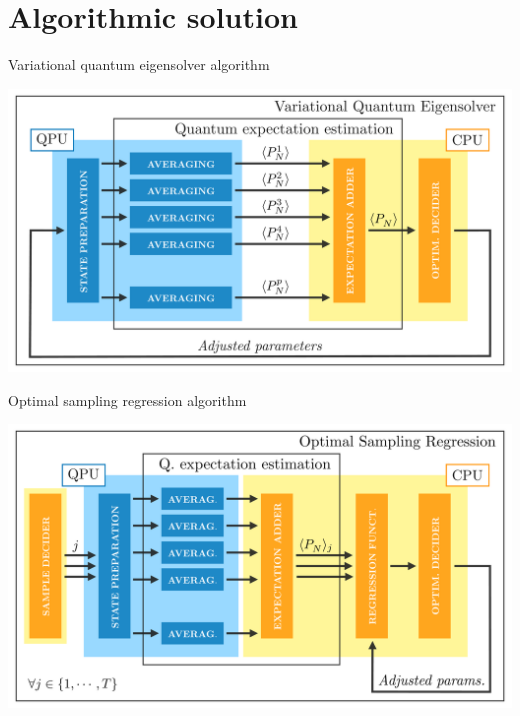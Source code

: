 \documentclass[9pt, aspectratio=169]{beamer}
\begin{document}
\section{Algorithmic solution}

\begin{frame}{Variational quantum eigensolver algorithm}

	\begin{center}
		\includegraphics[width=.7\paperwidth]{Figures/NJL1-model-solving/VQE}
	\end{center}

\end{frame}


\begin{frame}{Optimal sampling regression algorithm}

	\begin{center}
		\includegraphics[width=.7\paperwidth]{Figures/NJL1-model-solving/OSR}
	\end{center}

\end{frame}
\end{document}
